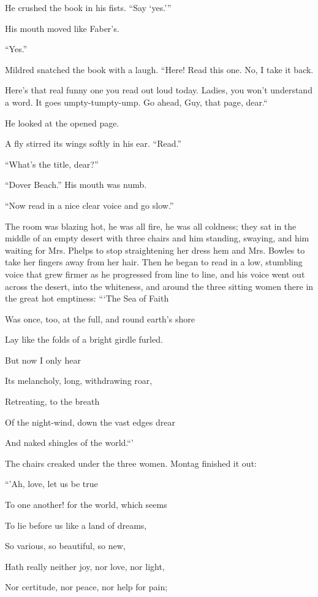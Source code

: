 \documentclass[11pt,openany]{book}
\begin{document}
He crushed the book in his fists. ``Say `yes.'''

His mouth moved like Faber's.

``Yes.''

Mildred snatched the book with a laugh. ``Here! Read this one. No, I take it back.

Here's that real funny one you read out loud today. Ladies, you won't understand a word. It goes umpty-tumpty-ump. Go ahead, Guy, that page, dear.``

He looked at the opened page.

A fly stirred its wings softly in his ear. ``Read.''

``What's the title, dear?''

``Dover Beach.'' His mouth was numb.

``Now read in a nice clear voice and go slow.''

The room was blazing hot, he was all fire, he was all coldness; they sat in the middle of an empty desert with three chairs and him standing, swaying, and him waiting for Mrs. Phelps to stop straightening her dress hem and Mrs. Bowles to take her fingers away from her hair. Then he began to read in a low, stumbling voice that grew firmer as he progressed from line to line, and his voice went out across the desert, into the whiteness, and around the three sitting women there in the great hot emptiness: ```The Sea of Faith

Was once, too, at the full, and round earth's shore

Lay like the folds of a bright girdle furled.

But now I only hear

Its melancholy, long, withdrawing roar,

Retreating, to the breath

Of the night-wind, down the vast edges drear

And naked shingles of the world.``'

The chairs creaked under the three women. Montag finished it out:

``'Ah, love, let us be true

To one another! for the world, which seems

To lie before us like a land of dreams,

So various, so beautiful, so new,

Hath really neither joy, nor love, nor light,

Nor certitude, nor peace, nor help for pain;
\end{document}

